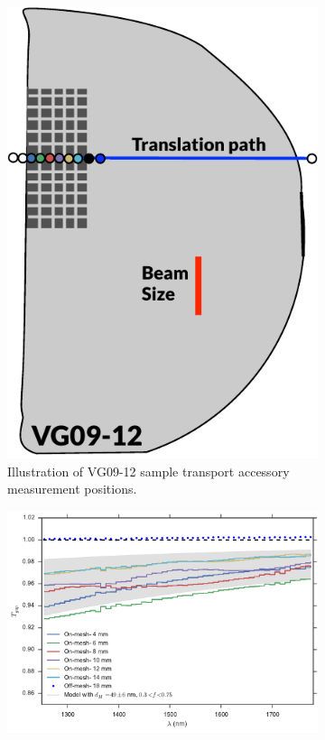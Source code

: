\documentclass[osajnl,preprint,showpacs,superscriptaddress,12pt]{revtex4-1} %
\begin{document}
\begin{figure}[htbp]
    \centering
    \begin{subfigure}[b]{0.35\textwidth}
        \includegraphics[width=\textwidth]{figs/VG09_12_STA_illustration.pdf}
        \caption{Illustration of VG09-12 sample transport accessory measurement positions. \label{figVG0912_STA_illus} }
    \end{subfigure}
    \begin{subfigure}[b]{0.65\textwidth}
        \includegraphics[width=\textwidth]{figs/VG0912_STA_scan_coarse.pdf}

\end{subfigure}
\end{figure}
\end{document}
